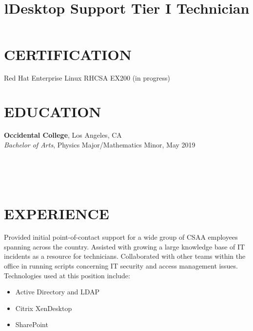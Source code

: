 \documentclass[margin]{res}
\begin{document}
\begin{resume}

	\section{CERTIFICATION}
	Red Hat Enterprise Linux RHCSA EX200 (in progress)


\section{EDUCATION}
\textbf{Occidental College}, Los Angeles, CA\\
{\sl Bachelor of Arts}, Physics Major/Mathematics Minor, May 2019\hfill 


\begin{format}
\title{l}\\
\\
\body\\
\end{format}

\section{EXPERIENCE}
\title{\textbf{Desktop Support Tier I Technician}}
\begin{position}
	Provided initial point-of-contact support for a wide group of CSAA employees spanning across the country. Assisted with growing a large knowledge base of IT incidents as a resource for technicians. Collaborated with other teams within the office in running scripts concerning IT security and access management issues. Technologies used at this position include:
	\begin{itemize}
		\item Active Directory and LDAP
		\item Citrix XenDesktop
		\item SharePoint
	\end{itemize}
\end{position}


\end{resume}
\end{document}
